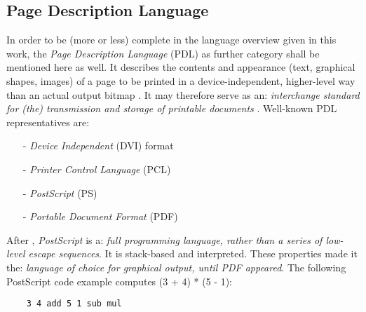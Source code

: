 %
%
%
%
%
%
%

\subsection{Page Description Language}
\label{page_description_language_heading}

In order to be (more or less) complete in the language overview given in this
work, the \emph{Page Description Language} (PDL) as further category shall be
mentioned here as well. It describes the contents and appearance (text,
graphical shapes, images) of a page to be printed in a device-independent,
higher-level way than an actual output bitmap \cite{wikipedia}. It may
therefore serve as an: \textit{interchange standard for (the) transmission and
storage of printable documents} \cite{foldoc}. Well-known PDL representatives
are:

\begin{itemize}
    \item[-] \emph{Device Independent} (DVI) format
    \item[-] \emph{Printer Control Language} (PCL)
    \item[-] \emph{PostScript} (PS)
    \item[-] \emph{Portable Document Format} (PDF)
\end{itemize}

After \cite{foldoc}, \emph{PostScript} is a: \textit{full programming language,
rather than a series of low-level escape sequences}. It is stack-based and
interpreted. These properties made it the: \textit{language of choice for
graphical output, until PDF appeared}. The following PostScript code example
\cite{wikipedia} computes (3 + 4) * (5 - 1):

\begin{scriptsize}
    \begin{verbatim}
    3 4 add 5 1 sub mul
    \end{verbatim}
\end{scriptsize}
